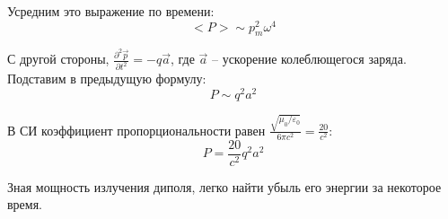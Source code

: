 \documentclass{article}
\begin{document}
	Усредним это выражение по времени:
	\begin{equation}
		<P>\sim p_m^2\omega^4
	\end{equation}

	С другой стороны, $\frac{\partial^2\vec p}{\partial t^2}=-q\vec a$, где $\vec a$ -- ускорение колеблющегося заряда. Подставим в предыдущую формулу:
	\begin{equation}
		P\sim q^2a^2
	\end{equation}

	В СИ коэффициент пропорциональности равен $\frac{\sqrt{\mu_0/\varepsilon_0}}{6\pi c^2}=\frac{20}{c^2}$:
	\begin{equation}
		P = \frac{20}{c^2}q^2a^2
	\end{equation}

	Зная мощность излучения диполя, легко найти убыль его энергии за некоторое время.
\end{document}
